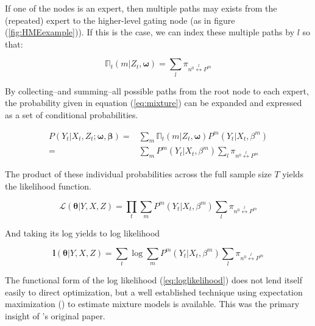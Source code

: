 \documentclass[12pt]{article}
\begin{document}
If one of the nodes is an expert, then multiple paths may exists from the (repeated)
expert to the higher-level gating node (as in figure (\ref{fig:HMEexample})). If this is
the case, we can index these multiple paths by $l$ so that:

\begin{equation} \label{eq:pathsums}
  \mathbb{\Pi}_{t}(m | Z_{t}, \boldsymbol{\omega}) = \sum_{l}\pi_{n^{0} \overset{l}{\longleftrightarrow} P^{m}}
\end{equation}

By collecting--and summing--all possible paths from the root node to each
expert, the probability given in equation (\ref{eq:mixture}) can be expanded
and expressed as a set of conditional probabilities.

\begin{equation} \label{eq:contribution}
  \begin{split}
    P(Y_{t}|X_{t}, Z_{t}; \boldsymbol{\omega}, \boldsymbol{\beta}) =& \sum_{m} \mathbb{\Pi}_{t}(m | Z_{t}, \boldsymbol{\omega}) P^{m}(Y_{t}|X_{t},\beta^{m}) \\ 
      =& \sum_{m} P^{m}(Y_{t}|X_{t}, \beta^{m}) \sum_{l}\pi_{n^{0} \overset{l}{\longleftrightarrow} P^{m}}
  \end{split}
\end{equation}

The product of these individual probabilities across the full sample size $T$ yields
the likelihood function.

\begin{equation} \label{eq:likelihood}
  \mathcal{L}(\boldsymbol{\theta}| Y, X, Z) = \prod_{t}\sum_{m}P^{m}(Y_{t}|X_{t},\beta^{m})\sum_{l}\pi_{n^{0} \overset{l}{\longleftrightarrow} P^{m}}
\end{equation}

And taking its log yields to log likelihood

\begin{equation} \label{eq:loglikelihood}
  \boldsymbol{l}(\boldsymbol{\theta}|Y, X, Z) = \sum_{t}\log\sum_{m}P^{m}(Y_{t}|X_{t},\beta^{m})\sum_{l}\pi_{n^{0}\overset{l}{\longleftrightarrow} P^{m}}
\end{equation}

The functional form of the log likelihood (\ref{eq:loglikelihood}) does not
lend itself easily to direct optimization, but a well established
technique using expectation maximization (\cite{EM_DLR1977}) to estimate mixture
models is available. This was the primary insight of \cite{JordanJacobs1993}'s
original paper.
\end{document}
